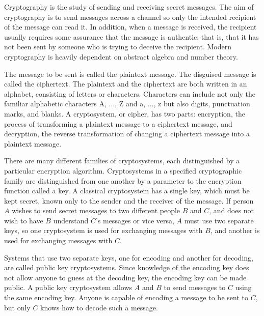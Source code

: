 
Cryptography is the study of sending and receiving secret messages.
The aim of cryptography is to send messages across a channel so only
the intended recipient of the message can read it. In addition, when a
message is received, the recipient usually requires some assurance that
the message is authentic; that is, that it has not been sent by
someone who is trying to deceive the recipient. Modern cryptography is
heavily dependent on abstract algebra and number theory. 
 
 
The message to be sent is called the {\bfi
plaintext\/} message. The disguised message is called
the {\bfi ciphertext}. The plaintext and the
ciphertext are both written in an {\bfi alphabet}, consisting of {\bfi
letters\/} or {\bfi characters}. Characters can include not only the
familiar alphabetic characters A, $\ldots$, Z and a, $\ldots$, z but
also digits, punctuation marks, and blanks. A {\bfi
cryptosystem}, or {\bfi
cipher},  has two parts: {\bfi encryption}, the process
of transforming a plaintext message to a ciphertext message, and {\bfi
decryption}, the reverse transformation of changing a ciphertext
message into a plaintext message.
 
 
There are many different families of cryptosystems, each distinguished
by a particular encryption algorithm. Cryptosystems in a specified
cryptographic family are distinguished from one another by a parameter
to the encryption function called a {\bfi key}. A classical cryptosystem has a single key, which must be kept
secret,  known only to the sender and the receiver of the message. If
person $A$ wishes to send secret messages to two different people $B$
and $C$, and does not wish to have $B$ understand $C$'s messages or
vice versa, $A$ must use two separate keys, so one cryptosystem is
used for exchanging messages with $B$, and another is used for
exchanging messages with $C$.
 
 
Systems that use two separate keys, one for encoding and another for
decoding, are called {\bfi public key
cryptosystems}. Since
knowledge of the encoding key does not allow anyone to guess at the
decoding key, the encoding key can be made public. A public key
cryptosystem allows $A$ and $B$ to send messages to $C$ using the same
encoding key.  Anyone is capable of encoding a message to be sent to
$C$, but only $C$ knows how to decode such a message.
 


